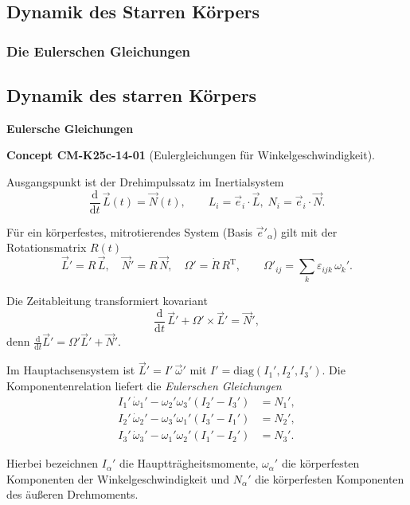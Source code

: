 \documentclass[10pt, letterpaper]{article}
\newcommand{\CustomHeading}[3]{%
  \par\medskip\noindent%
  \textbf{#1 #2} \textnormal{(#3)}.\enskip%
}
\newenvironment{CONC}[2]{\begin{unitbox}\CustomHeading{Concept}{#1}{#2}}{\end{unitbox}}
\begin{document}
\pagebreak


\subsection{Dynamik des Starren Körpers}



\subsubsection{Die Eulerschen Gleichungen}


\subsection*{Dynamik des starren Körpers}

\textbf{Eulersche Gleichungen}

\begin{CONC}{CM-K25c-14-01}{Eulergleichungen für Winkelgeschwindigkeit}
Ausgangspunkt ist der Drehimpulssatz im Inertialsystem
\[
\frac{\mathrm d}{\mathrm dt}\,\vec L(t)=\vec N(t), 
\qquad 
L_i=\vec e_i\!\cdot\!\vec L,\;
N_i=\vec e_i\!\cdot\!\vec N .
\]

Für ein körperfestes, mitrotierendes System (Basis $\vec e'_\alpha$) gilt mit der Rotationsmatrix $R(t)$
\[
\vec L' = R\,\vec L,
\quad
\vec N' = R\,\vec N,
\quad
\Omega' = \dot R\,R^{\mathrm T},
\qquad 
\Omega'_{ij}=\sum_k\varepsilon_{ijk}\,\omega_k'.
\]

Die Zeitableitung transformiert kovariant
\[
\frac{\mathrm d}{\mathrm dt}\,\vec L' + \Omega'\!\times\!\vec L' = \vec N' ,
\]
denn 
\(
\frac{\mathrm d}{\mathrm dt}\vec L' = \Omega'\vec L' + \vec N'.
\)

Im Hauptachsensystem ist $\vec L' = I'\,\vec\omega'$ mit $I'=\mathrm{diag}(I_1',I_2',I_3')$.  Die Komponentenrelation liefert die \emph{Eulerschen Gleichungen}
\[
\boxed{
\begin{aligned}
I_1'\,\dot\omega_1' - \omega_2'\omega_3'(I_2'-I_3') &= N_1',\\
I_2'\,\dot\omega_2' - \omega_3'\omega_1'(I_3'-I_1') &= N_2',\\
I_3'\,\dot\omega_3' - \omega_1'\omega_2'(I_1'-I_2') &= N_3'.
\end{aligned}}
\]

Hierbei bezeichnen $I_\alpha'$ die Hauptträgheitsmomente, $\omega_\alpha'$ die körperfesten Komponenten der Winkelgeschwindigkeit und $N_\alpha'$ die körperfesten Komponenten des äußeren Drehmoments.
\end{CONC}
\end{document}
